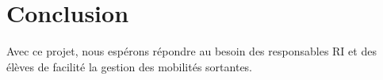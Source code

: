 \chapter{Conclusion}

Avec ce projet, nous espérons répondre au besoin des responsables RI et des élèves de facilité la gestion des mobilités sortantes. 